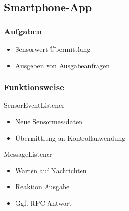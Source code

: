 \documentclass{beamer}
\begin{document}
\subsection{Smartphone-App}

\begin{frame}
    \frametitle{Aufgaben}
    \begin{itemize}
        \item Sensorwert-Übermittlung
        \item Ausgeben von Ausgabeanfragen
    \end{itemize}
\end{frame}

\begin{frame}
    \frametitle[]{Funktionsweise}
    SensorEventListener
    \begin{itemize}
        \item Neue Sensormessdaten
        \item Übermittlung an Kontrollanwendung
    \end{itemize}
    \vspace{1cm}
    MessageListener
    \begin{itemize}
        \item Warten auf Nachrichten
        \item Reaktion Ausgabe
        \item Ggf. RPC-Antwort
    \end{itemize}

\end{frame}
\end{document}
